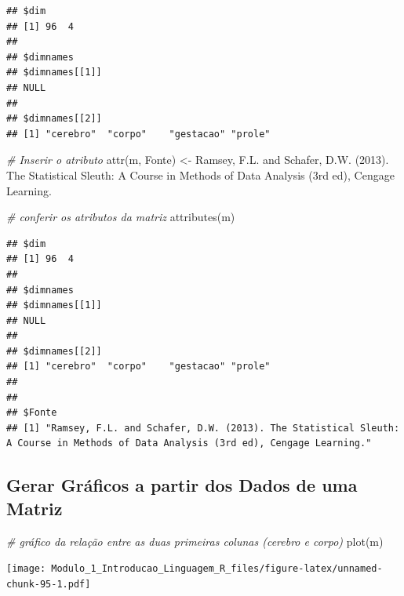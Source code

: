 \documentclass[
]{article}
\newenvironment{Shaded}{\begin{snugshade}}{\end{snugshade}}
\newcommand{\CommentTok}[1]{\textcolor[rgb]{0.56,0.35,0.01}{\textit{#1}}}
\newcommand{\FunctionTok}[1]{\textcolor[rgb]{0.00,0.00,0.00}{#1}}
\newcommand{\NormalTok}[1]{#1}
\newcommand{\OtherTok}[1]{\textcolor[rgb]{0.56,0.35,0.01}{#1}}
\newcommand{\StringTok}[1]{\textcolor[rgb]{0.31,0.60,0.02}{#1}}
\begin{document}
\begin{verbatim}
## $dim
## [1] 96  4
## 
## $dimnames
## $dimnames[[1]]
## NULL
## 
## $dimnames[[2]]
## [1] "cerebro"  "corpo"    "gestacao" "prole"
\end{verbatim}

\begin{Shaded}
\begin{Highlighting}[]
\CommentTok{\# Inserir o atributo}
\FunctionTok{attr}\NormalTok{(m, }\StringTok{\textquotesingle{}Fonte\textquotesingle{}}\NormalTok{) }\OtherTok{\textless{}{-}} \StringTok{\textquotesingle{}Ramsey, F.L. and Schafer, D.W. (2013). The Statistical Sleuth: A Course in Methods of Data Analysis (3rd ed), Cengage Learning.\textquotesingle{}}
\end{Highlighting}
\end{Shaded}

\begin{Shaded}
\begin{Highlighting}[]
\CommentTok{\# conferir os atributos da matriz}
\FunctionTok{attributes}\NormalTok{(m)}
\end{Highlighting}
\end{Shaded}

\begin{verbatim}
## $dim
## [1] 96  4
## 
## $dimnames
## $dimnames[[1]]
## NULL
## 
## $dimnames[[2]]
## [1] "cerebro"  "corpo"    "gestacao" "prole"   
## 
## 
## $Fonte
## [1] "Ramsey, F.L. and Schafer, D.W. (2013). The Statistical Sleuth: A Course in Methods of Data Analysis (3rd ed), Cengage Learning."
\end{verbatim}

\hypertarget{gerar-gruxe1ficos-a-partir-dos-dados-de-uma-matriz}{%
\subsection{Gerar Gráficos a partir dos Dados de uma
Matriz}\label{gerar-gruxe1ficos-a-partir-dos-dados-de-uma-matriz}}

\begin{Shaded}
\begin{Highlighting}[]
\CommentTok{\# gráfico da relação entre as duas primeiras colunas (cerebro e corpo)}
\FunctionTok{plot}\NormalTok{(m)}
\end{Highlighting}
\end{Shaded}

\texttt{[image: Modulo\_1\_Introducao\_Linguagem\_R\_files/figure-latex/unnamed-chunk-95-1.pdf]}
\end{document}
